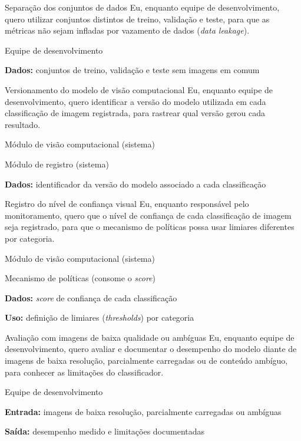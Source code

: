 \documentclass[
    12pt,           %
    oneside,        %
    a4paper,        %
    chapter=TITLE,  %
    english,        %
    brazil          %
]{abntex2}
\begin{document}
{Separação dos conjuntos de dados}
{Eu, enquanto equipe de desenvolvimento, quero utilizar conjuntos distintos de treino, validação e teste, para que as métricas não sejam infladas por vazamento de dados (\textit{data leakage}).}
{\begin{dadoslista}
\item Equipe de desenvolvimento
\end{dadoslista}}
{\begin{dadoslista}
\item \textbf{Dados:} conjuntos de treino, validação e teste sem imagens em comum
\end{dadoslista}}

{Versionamento do modelo de visão computacional}
{Eu, enquanto equipe de desenvolvimento, quero identificar a versão do modelo utilizada em cada classificação de imagem registrada, para rastrear qual versão gerou cada resultado.}
{\begin{dadoslista}
\item Módulo de visão computacional (sistema)
\item Módulo de registro (sistema)
\end{dadoslista}}
{\begin{dadoslista}
\item \textbf{Dados:} identificador da versão do modelo associado a cada classificação
\end{dadoslista}}

{Registro do nível de confiança visual}
{Eu, enquanto responsável pelo monitoramento, quero que o nível de confiança de cada classificação de imagem seja registrado, para que o mecanismo de políticas possa usar limiares diferentes por categoria.}
{\begin{dadoslista}
\item Módulo de visão computacional (sistema)
\item Mecanismo de políticas (consome o \textit{score})
\end{dadoslista}}
{\begin{dadoslista}
\item \textbf{Dados:} \textit{score} de confiança de cada classificação
\item \textbf{Uso:} definição de limiares (\textit{thresholds}) por categoria
\end{dadoslista}}

{Avaliação com imagens de baixa qualidade ou ambíguas}
{Eu, enquanto equipe de desenvolvimento, quero avaliar e documentar o desempenho do modelo diante de imagens de baixa resolução, parcialmente carregadas ou de conteúdo ambíguo, para conhecer as limitações do classificador.}
{\begin{dadoslista}
\item Equipe de desenvolvimento
\end{dadoslista}}
{\begin{dadoslista}
\item \textbf{Entrada:} imagens de baixa resolução, parcialmente carregadas ou ambíguas
\item \textbf{Saída:} desempenho medido e limitações documentadas
\end{dadoslista}}
\end{document}

